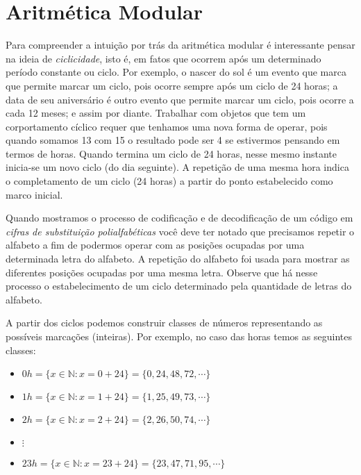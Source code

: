\section{Aritm\'{e}tica Modular}

Para compreender a intui\c{c}\~{a}o por tr\'{a}s da aritm\'{e}tica modular \'{e} interessante pensar na ideia de \textit{ciclicidade}, 
isto \'{e}, em
fatos que ocorrem ap\'{o}s um determinado per\'{i}odo constante ou ciclo. Por exemplo, o nascer do sol \'{e} um evento que marca 
que permite marcar um ciclo, pois ocorre sempre ap\'{o}s um ciclo de 24 horas; a data de seu anivers\'{a}rio \'{e} outro evento que permite marcar um ciclo, pois ocorre a cada 12 meses; e assim por diante. Trabalhar com objetos que tem um corportamento c\'{i}clico requer que tenhamos uma nova forma de operar, pois quando somamos 13 com 15 o resultado pode ser 4 se estivermos pensando em termos de horas. Quando termina um ciclo de 24 horas, nesse mesmo instante inicia-se um novo ciclo (do dia seguinte). A repeti\c{c}\~{a}o de uma mesma hora indica o completamento de um ciclo (24 horas) a partir do ponto estabelecido como marco inicial. 

Quando mostramos o processo de codifica\c{c}\~{a}o e de decodifica\c{c}\~{a}o de um c\'{o}digo em 
\textit{cifras de substitui\c{c}\~{a}o polialfab\'{e}ticas} voc\^{e} deve ter notado que precisamos repetir o alfabeto 
a fim de podermos operar com as posi\c{c}\~{o}es ocupadas por uma determinada letra do alfabeto. A repeti\c{c}\~{a}o do alfabeto 
foi usada para mostrar as diferentes posi\c{c}\~{o}es ocupadas por uma mesma letra. Observe que h\'{a} nesse processo o 
estabelecimento de um ciclo determinado pela quantidade de letras do alfabeto.

A partir dos ciclos podemos construir classes de n\'{u}meros representando as poss\'{i}veis marca\c{c}\~{o}es (inteiras). Por exemplo,  
no caso das horas temos as seguintes classes:  

\begin{itemize}
	\item $0h=\{x\in\mathbb{N}: x=0+24\}=\{0, 24, 48, 72, \cdots\}$ 
	\item $1h=\{x\in\mathbb{N}: x=1+24\}=\{1, 25, 49, 73, \cdots\}$
	\item $2h=\{x\in\mathbb{N}: x=2+24\}=\{2, 26, 50, 74, \cdots\}$
	\item $\vdots$
	\item $23h=\{x\in\mathbb{N}: x=23+24\}=\{23, 47, 71, 95, \cdots\}$
\end{itemize}

